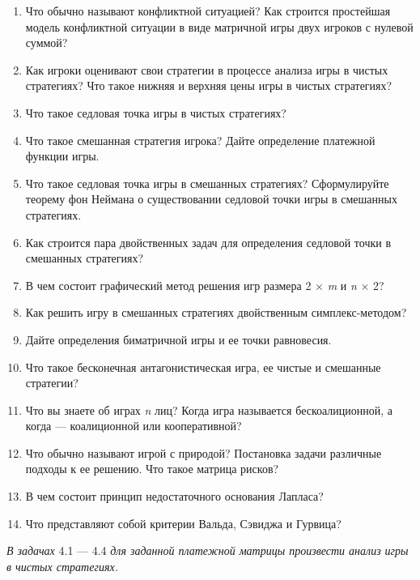 \begin{enumerate}
  \item Что обычно называют конфликтной ситуацией? Как строится простейшая модель конфликтной ситуации в виде матричной игры двух игроков с нулевой суммой?
  \item Как игроки оценивают свои стратегии в процессе анализа игры в чистых стратегиях? Что такое нижняя и верхняя цены игры в чистых стратегиях?
  \item Что такое седловая точка игры в чистых стратегиях?
  \item Что такое смешанная стратегия игрока? Дайте определение платежной функции игры.
  \item Что такое седловая точка игры в смешанных стратегиях? Сформулируйте теорему фон Неймана о существовании седловой точки игры в смешанных стратегиях.
  \item Как строится пара двойственных задач для определения седловой точки в смешанных стратегиях?
  \item В чем состоит графический метод решения игр размера 2 $\times$ \emph{m} и \emph{n} $\times$ 2?
  \item Как решить игру в смешанных стратегиях двойственным симплекс-методом?
  \item Дайте определения биматричной игры и ее точки равновесия.
  \item Что такое бесконечная антагонистическая игра, ее чистые и смешанные стратегии?
  \item Что вы знаете об играх \emph{n} лиц? Когда игра называется бескоалиционной, а когда — коалиционной или кооперативной?
  \item Что обычно называют игрой с природой? Постановка задачи различные подходы к ее решению. Что такое матрица рисков?
  \item В чем состоит принцип недостаточного основания Лапласа?
  \item Что представляют собой критерии Вальда, Сэвиджа и Гурвица?
\end{enumerate}
\emph{В задачах} 4.1 — 4.4 \emph{для заданной платежной матрицы произвести анализ игры в чистых стратегиях.}

